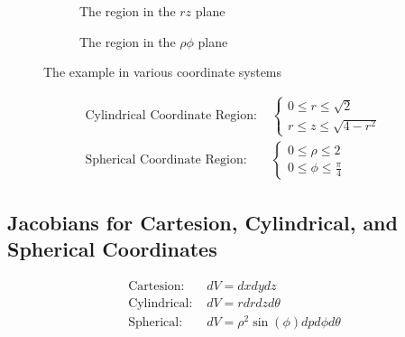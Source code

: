 \documentclass{article}
\begin{document}
    \begin{figure}[ht]
    \centering
        \begin{subfigure}[b]{0.3\textwidth}
            \caption{The region in the $rz$ plane}
            \label{fig:sub1}
        \end{subfigure}
        \begin{subfigure}[b]{0.3\textwidth}
            \caption{The region in the $\rho \phi$ plane}
            \label{fig:sub1}
        \end{subfigure}
        \caption{The example in various coordinate systems}
    \end{figure}

    \[
        \begin{aligned}
        \text{Cylindrical Coordinate Region: }& \begin{cases}
            0 \le r \le \sqrt{2}\\
            r \le z \le \sqrt{4-r^2}
        \end{cases}\\
        \text{Spherical Coordinate Region: }& \begin{cases}
            0 \le \rho \le 2\\
            0 \le \phi \le \frac{\pi}{4}
        \end{cases}
        \end{aligned}
    \]


    \subsection{Jacobians for Cartesion, Cylindrical, and Spherical Coordinates}
    \begin{equation}
    \begin{aligned}
    \text{Cartesion: }& dV=dxdydz\\
    \text{Cylindrical: }& dV=rdrdzd\theta\\
    \text{Spherical: }& dV=\rho^2 \sin(\phi) dpd\phi d\theta\\
    \end{aligned}
    \end{equation}
\end{document}
